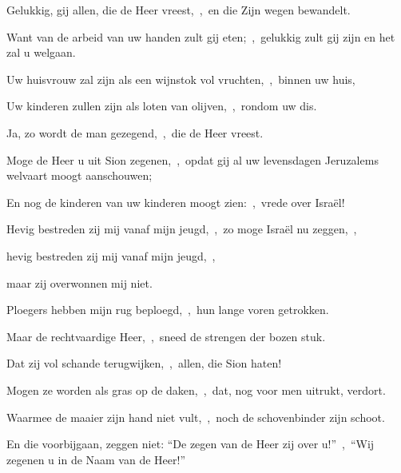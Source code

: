 \documentclass[12pt,twoside,a5paper]{article}
\begin{document}

\begin{halfparskip}
  Gelukkig, gij allen, die de Heer vreest,~\sep\ en die Zijn wegen bewandelt.

  Want van de arbeid van uw handen zult gij eten;~\sep\ gelukkig zult gij zijn en het zal u welgaan.

  Uw huisvrouw zal zijn als een wijnstok vol vruchten,~\sep\ binnen uw huis,

  Uw kinderen zullen zijn als loten van olijven,~\sep\ rondom uw dis.

  Ja, zo wordt de man gezegend,~\sep\ die de Heer vreest.

  Moge de Heer u uit Sion zegenen,~\sep\ opdat gij al uw levensdagen Jeruzalems welvaart moogt aanschouwen;

  En nog de kinderen van uw kinderen moogt zien:~\sep\ vrede over Israël!
\end{halfparskip}


\begin{halfparskip}

  Hevig bestreden zij mij vanaf mijn jeugd,~\sep\ zo moge Israël nu zeggen,~\sep

  hevig bestreden zij mij vanaf mijn jeugd,~\sep

  maar zij overwonnen mij niet.

  Ploegers hebben mijn rug beploegd,~\sep\ hun lange voren getrokken.

  Maar de rechtvaardige Heer,~\sep\ sneed de strengen der bozen stuk.
\end{halfparskip}

\begin{halfparskip}

  Dat zij vol schande terugwijken,~\sep\ allen, die Sion haten!

  Mogen ze worden als gras op de daken,~\sep\ dat, nog voor men uitrukt, verdort.

  Waarmee de maaier zijn hand niet vult,~\sep\ noch de schovenbinder zijn schoot.

  En die voorbijgaan, zeggen niet: ``De zegen van de Heer zij over u!''~\sep\ ``Wij zegenen u in de Naam van de Heer!''
\end{halfparskip}
\end{document}
